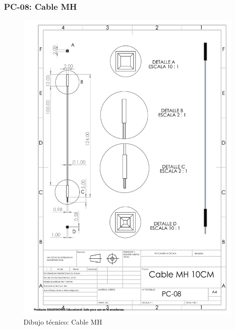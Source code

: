     \subsubsection{PC-08: Cable MH }
    \begin{figure}[H]
        \centering
        \includegraphics[trim = {7mm 1mm 1mm 1mm},clip,scale=0.4]{22/Img/cableMHDibujo.PDF}
        \caption{Dibujo técnico: Cable MH}
        \label{fig:enter-label8}
    \end{figure}
    
    
    
